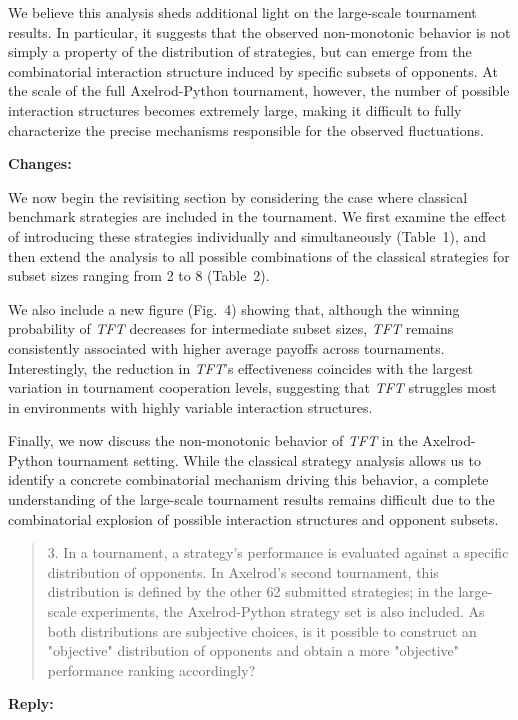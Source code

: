 \documentclass[11pt]{article}
\newcommand{\reply}{
\vspace{0.25em}
{\color{ForestGreen}\textbf{Reply:}}
}
\newcommand{\changes}{
\vspace{0.25em}
{\color{BrickRed}\textbf{Changes:}}
}
\newenvironment{reviewercomment}
{
\vspace{0.5em}
\begin{quote}
\color{NavyBlue}
}
{
\end{quote}
}
\newcommand{\TFT}{\emph{TFT}}
\newcommand{\AXL}{Axelrod-Python}
\begin{document}
We believe this analysis sheds additional light on the large-scale tournament
results. In particular, it suggests that the observed non-monotonic behavior
is not simply a property of the distribution of strategies, but can emerge from
the combinatorial interaction structure induced by specific subsets of
opponents. At the scale of the full \AXL{} tournament, however, the number of
possible interaction structures becomes extremely large, making it difficult to
fully characterize the precise mechanisms responsible for the observed
fluctuations.

\changes

We now begin the revisiting section by considering the case where classical
benchmark strategies are included in the tournament. We first examine the
effect of introducing these strategies individually and simultaneously
(Table~1), and then extend the analysis to all possible combinations of the
classical strategies for subset sizes ranging from 2 to 8 (Table~2).

We also include a new figure (Fig.~4) showing that, although the winning
probability of \TFT{} decreases for intermediate subset sizes, \TFT{} remains
consistently associated with higher average payoffs across tournaments.
Interestingly, the reduction in \TFT{}'s effectiveness coincides with the
largest variation in tournament cooperation levels, suggesting that \TFT{}
struggles most in environments with highly variable interaction structures.

Finally, we now discuss the non-monotonic behavior of \TFT{} in the
\AXL{} tournament setting. While the classical strategy analysis allows us to
identify a concrete combinatorial mechanism driving this behavior, a complete
understanding of the large-scale tournament results remains difficult due to
the combinatorial explosion of possible interaction structures and opponent
subsets.

\begin{reviewercomment}
3. In a tournament, a strategy's performance is evaluated against a specific
distribution of opponents. In Axelrod's second tournament, this distribution is
defined by the other 62 submitted strategies; in the large-scale experiments,
the Axelrod-Python strategy set is also included. As both distributions are
subjective choices, is it possible to construct an "objective" distribution of
opponents and obtain a more "objective" performance ranking accordingly?
\end{reviewercomment}

\reply
\end{document}
